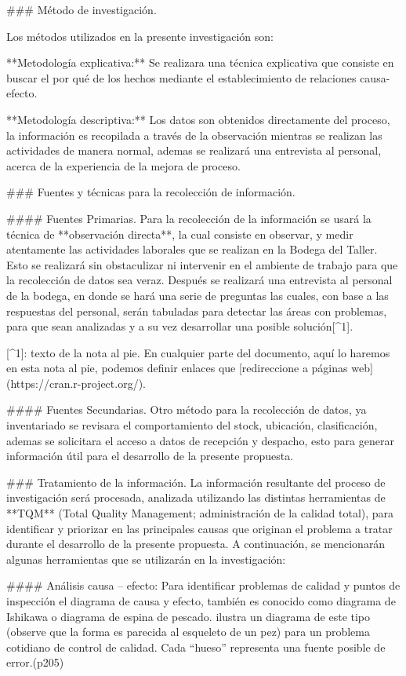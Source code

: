 \documentclass{article}\usepackage[]{graphicx}\usepackage[]{xcolor}
\begin{document}
### Método de investigación.

Los métodos utilizados en la presente investigación son:

**Metodología explicativa:** Se realizara una técnica explicativa que consiste en buscar el por qué de los hechos mediante el establecimiento de relaciones causa-efecto.

**Metodología descriptiva:** Los datos son obtenidos directamente del proceso, la información es recopilada a través de la observación mientras se realizan las actividades de manera normal, ademas se realizará una entrevista al personal, acerca de la experiencia de la mejora de proceso.

### Fuentes y técnicas para la recolección de información.

#### Fuentes Primarias.
Para la recolección de la información se usará la técnica de **observación directa**, la cual consiste en observar, y medir atentamente las actividades laborales que se realizan en la Bodega del Taller. Esto se realizará sin obstaculizar ni intervenir en el ambiente de trabajo para que la recolección de datos sea veraz. Después se realizará una entrevista al personal de la bodega, en donde se hará una serie de preguntas las cuales, con base a las respuestas del personal,
serán tabuladas para detectar las áreas con problemas, para que sean analizadas y a su vez desarrollar una posible solución[^1].

[^1]: texto de la nota al pie. En cualquier parte del documento, aquí lo haremos en esta nota al pie, podemos definir enlaces que [redireccione a páginas web](https://cran.r-project.org/).

#### Fuentes Secundarias.
Otro método para la recolección de datos, ya inventariado se revisara el comportamiento del stock, ubicación, clasificación, ademas se solicitara el acceso a datos de recepción y despacho, esto para generar información útil para el desarrollo de la presente propuesta.

### Tratamiento de la información.
La información resultante del proceso de investigación será procesada, analizada utilizando las distintas herramientas de  **TQM** (Total Quality Management; administración de la calidad total), para identificar y priorizar en las principales causas que originan el problema a tratar durante el desarrollo de la presente propuesta. A continuación, se mencionarán algunas herramientas que se utilizarán en la investigación:

#### Análisis causa – efecto:
Para identificar problemas de calidad y puntos de inspección el diagrama de
causa y efecto, también es conocido como diagrama de Ishikawa o diagrama de espina de pescado. ilustra un diagrama de este tipo (observe que la forma es parecida al esqueleto de un pez)
para un problema cotidiano de control de calidad. Cada “hueso” representa
una fuente posible de error.(p205)
\end{document}
